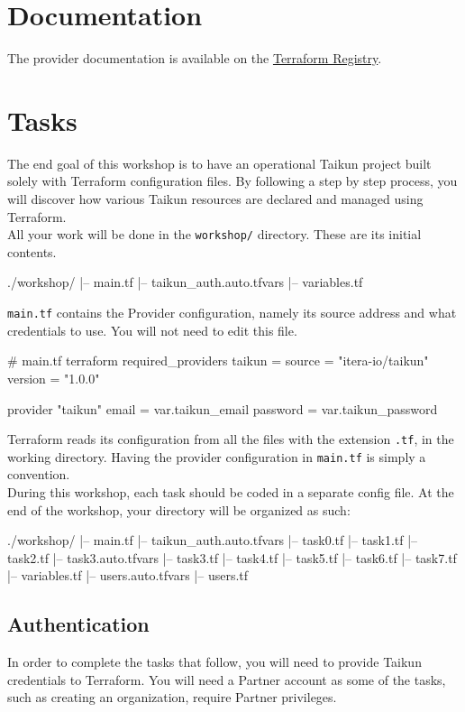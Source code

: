 \section{Documentation}
The provider documentation is available on the \href{https://registry.terraform.io/providers/itera-io/taikun/latest/docs}{Terraform Registry}.

\section{Tasks}
The end goal of this workshop is to have an operational Taikun project built solely with Terraform
configuration files.
By following a step by step process, you will discover how various Taikun
resources are declared and managed using Terraform.\\

All your work will be done in the \texttt{workshop/} directory. These are its initial contents.
\begin{raw}
./workshop/
|-- main.tf
|-- taikun_auth.auto.tfvars
|-- variables.tf
\end{raw}
\texttt{main.tf} contains the Provider configuration,
namely its source address and what credentials to use.
You will not need to edit this file.
\begin{tf}
# main.tf
terraform {
  required_providers {
    taikun = {
      source = "itera-io/taikun"
      version = "1.0.0"
    }
  }
}

provider "taikun" {
  email    = var.taikun_email
  password = var.taikun_password
}
\end{tf}
Terraform reads its configuration from all the files with the extension \texttt{.tf},
in the working directory.
Having the provider configuration in \texttt{main.tf} is simply a convention.\\

During this workshop, each task should be coded in a separate config file.
At the end of the workshop, your directory will be organized as such:
\begin{raw}
./workshop/
|-- main.tf
|-- taikun_auth.auto.tfvars
|-- task0.tf
|-- task1.tf
|-- task2.tf
|-- task3.auto.tfvars
|-- task3.tf
|-- task4.tf
|-- task5.tf
|-- task6.tf
|-- task7.tf
|-- variables.tf
|-- users.auto.tfvars
|-- users.tf
\end{raw}

\subsection{Authentication}\label{sec:auth}
In order to complete the tasks that follow, you will need to provide Taikun credentials to Terraform.
You will need a Partner account as some of the tasks, such as creating an organization,
require Partner privileges.\\


